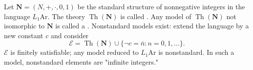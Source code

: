 Let $\mathbf{N} = (N, +, \cdot, 0, 1)$ be the standard structure of nonnegative integers in the language $L_1\mathrm{Ar}$. The theory $\operatorname{Th}(\mathbf{N})$ is called . Any model of $\operatorname{Th}(\mathbf{N})$ not isomorphic to $\mathbf{N}$ is called a . Nonstandard models exist: extend the language by a new constant $c$ and consider
$$\mathcal{E} = \operatorname{Th}(\mathbf{N}) \cup \{ \neg c = \bar{n} : n = 0, 1, \ldots \}.$$
$\mathcal{E}$ is finitely satisfiable; any model reduced to $L_1\mathrm{Ar}$ is nonstandard. In such a model, nonstandard elements are "infinite integers."
